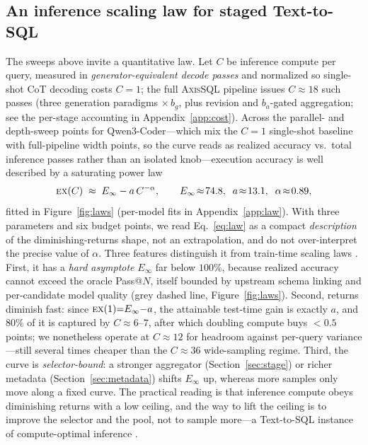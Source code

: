 \documentclass{article}
\newcommand{\sys}{\textsc{AxisSQL}\xspace}
\newcommand{\ex}{\textsc{ex}\xspace}
\begin{document}

\subsection{An inference scaling law for staged Text-to-SQL}
\label{sec:laws}

The sweeps above invite a quantitative law. Let $C$ be inference compute per query, measured in \emph{generator-equivalent decode passes} and normalized so single-shot CoT decoding costs $C{=}1$; the full \sys{} pipeline issues $C\!\approx\!18$ such passes (three generation paradigms $\times\,b_g$, plus revision and $b_a$-gated aggregation; see the per-stage accounting in Appendix~\ref{app:cost}). Across the parallel- and depth-sweep points for Qwen3-Coder---which mix the $C{=}1$ single-shot baseline with full-pipeline width points, so the curve reads as realized accuracy vs.\ total inference passes rather than an isolated knob---execution accuracy is well described by a saturating power law
\begin{equation}
\ex(C)\;\approx\;E_\infty - a\,C^{-\alpha},\qquad E_\infty\!\approx\!74.8,\;\; a\!\approx\!13.1,\;\; \alpha\!\approx\!0.89,
\label{eq:law}
\end{equation}
fitted in Figure~\ref{fig:laws} (per-model fits in Appendix~\ref{app:law}). With three parameters and six budget points, we read Eq.~\ref{eq:law} as a compact \emph{description} of the diminishing-returns shape, not an extrapolation, and do not over-interpret the precise value of $\alpha$. Three features distinguish it from train-time scaling laws \citep{kaplan2020scaling,hoffmann2022chinchilla}. First, it has a \emph{hard asymptote} $E_\infty$ far below $100\%$, because realized accuracy cannot exceed the oracle Pass@$N$, itself bounded by upstream schema linking and per-candidate model quality (grey dashed line, Figure~\ref{fig:laws}). Second, returns diminish fast: since $\ex(1){=}E_\infty{-}a$, the attainable test-time gain is exactly $a$, and $80\%$ of it is captured by $C\!\approx\!6\text{--}7$, after which doubling compute buys $<\!0.5$ points; we nonetheless operate at $C\!\approx\!12$ for headroom against per-query variance---still several times cheaper than the $C\!\approx\!36$ wide-sampling regime. Third, the curve is \emph{selector-bound}: a stronger aggregator (Section~\ref{sec:stage}) or richer metadata (Section~\ref{sec:metadata}) shifts $E_\infty$ up, whereas more samples only move along a fixed curve. The practical reading is that inference compute obeys diminishing returns with a low ceiling, and the way to lift the ceiling is to improve the selector and the pool, not to sample more---a Text-to-SQL instance of compute-optimal inference \citep{wu2025inference,snell2025scaling,welleck2024decoding}.
\end{document}

